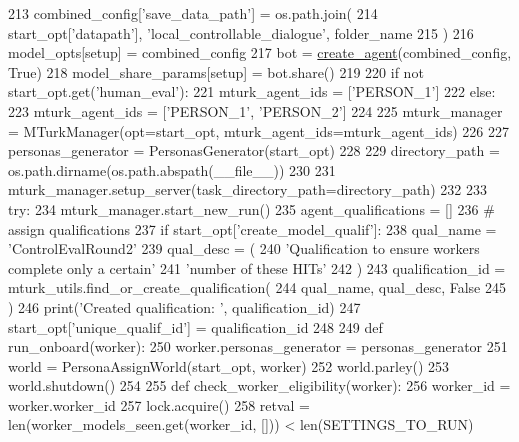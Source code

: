 \begin{DoxyCode}
{{{{213         combined\_config[\textcolor{stringliteral}{'save\_data\_path'}] = os.path.join(
214             start\_opt[\textcolor{stringliteral}{'datapath'}], \textcolor{stringliteral}{'local\_controllable\_dialogue'}, folder\_name
215         )
216         model\_opts[setup] = combined\_config
217         bot = \hyperlink{namespaceparlai_1_1core_1_1agents_ad0d54074d4bcc148bb415ab5515a53b5}{create\_agent}(combined\_config, \textcolor{keyword}{True})
218         model\_share\_params[setup] = bot.share()
219 
220     \textcolor{keywordflow}{if} \textcolor{keywordflow}{not} start\_opt.get(\textcolor{stringliteral}{'human\_eval'}):
221         mturk\_agent\_ids = [\textcolor{stringliteral}{'PERSON\_1'}]
222     \textcolor{keywordflow}{else}:
223         mturk\_agent\_ids = [\textcolor{stringliteral}{'PERSON\_1'}, \textcolor{stringliteral}{'PERSON\_2'}]
224 
225     mturk\_manager = MTurkManager(opt=start\_opt, mturk\_agent\_ids=mturk\_agent\_ids)
226 
227     personas\_generator = PersonasGenerator(start\_opt)
228 
229     directory\_path = os.path.dirname(os.path.abspath(\_\_file\_\_))
230 
231     mturk\_manager.setup\_server(task\_directory\_path=directory\_path)
232 
233     \textcolor{keywordflow}{try}:
234         mturk\_manager.start\_new\_run()
235         agent\_qualifications = []
236         \textcolor{comment}{# assign qualifications}
237         \textcolor{keywordflow}{if} start\_opt[\textcolor{stringliteral}{'create\_model\_qualif'}]:
238             qual\_name = \textcolor{stringliteral}{'ControlEvalRound2'}
239             qual\_desc = (
240                 \textcolor{stringliteral}{'Qualification to ensure workers complete only a certain'}
241                 \textcolor{stringliteral}{'number of these HITs'}
242             )
243             qualification\_id = mturk\_utils.find\_or\_create\_qualification(
244                 qual\_name, qual\_desc, \textcolor{keyword}{False}
245             )
246             print(\textcolor{stringliteral}{'Created qualification: '}, qualification\_id)
247             start\_opt[\textcolor{stringliteral}{'unique\_qualif\_id'}] = qualification\_id
248 
249         \textcolor{keyword}{def }run\_onboard(worker):
250             worker.personas\_generator = personas\_generator
251             world = PersonaAssignWorld(start\_opt, worker)
252             world.parley()
253             world.shutdown()
254 
255         \textcolor{keyword}{def }check\_worker\_eligibility(worker):
256             worker\_id = worker.worker\_id
257             lock.acquire()
258             retval = len(worker\_models\_seen.get(worker\_id, [])) < len(SETTINGS\_TO\_RUN)
}}}}
\end{DoxyCode}
